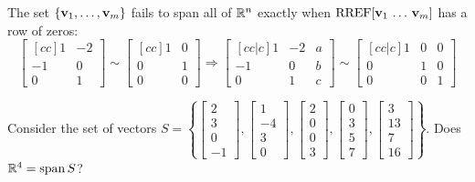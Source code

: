 \begin{applicationActivities}{4}{10}
\begin{fact}
  The set \(\{\mathbf v_1,\dots,\mathbf v_m\}\) fails to span all of \(\mathbb{R}^n\)
  exactly when \(\operatorname{RREF}[\mathbf v_1\,\dots\,\mathbf v_m]\) has a row of zeros:
  \[\begin{bmatrix}[cc]1&-2\\-1&0\\0&1\end{bmatrix}\sim
  \begin{bmatrix}[cc]1&0\\0&1\\0&0\end{bmatrix}\Rightarrow
  \begin{bmatrix}[cc|c]1&-2&a\\-1&0&b\\0&1&c\end{bmatrix}\sim
  \begin{bmatrix}[cc|c]1&0&0\\0&1&0\\0&0&1\end{bmatrix}\]
\end{fact}

\begin{activity}{5}
  Consider the set of vectors \(S=\left\{
  \begin{bmatrix}2\\3\\0\\-1\end{bmatrix},
  \begin{bmatrix}1\\-4\\3\\0\end{bmatrix},
  \begin{bmatrix}2\\0\\0\\3\end{bmatrix},
  \begin{bmatrix}0\\3\\5\\7\end{bmatrix},
  \begin{bmatrix}3\\13\\7\\16\end{bmatrix}
  \right\}
  \).
  Does
  \(\mathbb{R}^4=\operatorname{span} S\)?
\end{activity}


\end{applicationActivities}
